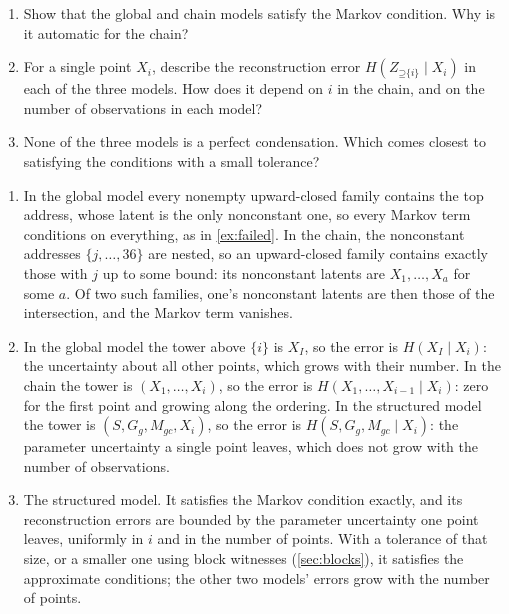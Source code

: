 \documentclass[11pt]{article}
\newcommand{\Up}{\mathord{\supseteq}}
\begin{document}
\begin{exercise}
\label{ex:organizations}
\begin{enumerate}
\item Show that the global and chain models satisfy the Markov condition. Why
is it automatic for the chain?
\item For a single point $X_i$, describe the reconstruction error
$H(Z_{\Up\{i\}}\mid X_i)$ in each of the three models. How does it depend on
$i$ in the chain, and on the number of observations in each model?
\item None of the three models is a perfect condensation. Which comes closest
to satisfying the conditions with a small tolerance?
\end{enumerate}
\end{exercise}
\begin{solution}[ex:organizations]
\begin{enumerate}
\item In the global model every nonempty upward-closed family contains the
top address, whose latent is the only nonconstant one, so every Markov term
conditions on everything, as in \cref{ex:failed}. In the chain, the
nonconstant addresses $\{j,\ldots,36\}$ are nested, so an upward-closed family
contains exactly those with $j$ up to some bound: its nonconstant latents are
$X_1,\ldots,X_a$ for some $a$. Of two such families, one's nonconstant latents
are then those of the intersection, and the Markov term vanishes.
\item In the global model the tower above $\{i\}$ is $X_I$, so the error is
$H(X_I\mid X_i)$: the uncertainty about all other points, which grows with
their number. In the chain the tower is $(X_1,\ldots,X_i)$, so the error is
$H(X_1,\ldots,X_{i-1}\mid X_i)$: zero for the first point and growing along
the ordering. In the structured model the tower is $(S,G_g,M_{gc},X_i)$, so
the error is $H(S,G_g,M_{gc}\mid X_i)$: the parameter uncertainty a single
point leaves, which does not grow with the number of observations.
\item The structured model. It satisfies the Markov condition exactly, and
its reconstruction errors are bounded by the parameter uncertainty one point
leaves, uniformly in $i$ and in the number of points. With a tolerance of that
size, or a smaller one using block witnesses (\cref{sec:blocks}), it
satisfies the approximate conditions; the other two models' errors grow with
the number of points.
\end{enumerate}
\end{solution}
\end{document}
